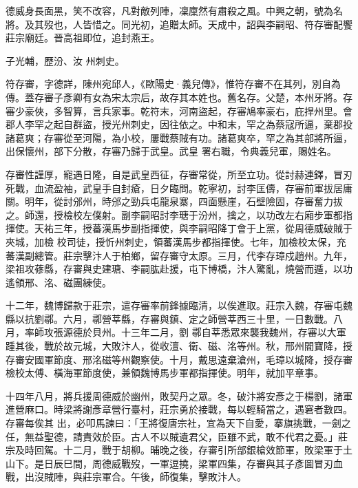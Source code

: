 \begin{pinyinscope}
 德威身長面黑，笑不改容，凡對敵列陣，凜廩然有肅殺之風。中興之朝，號為名將。及其歿也，人皆惜之。同光初，追贈太師。天成中，詔與李嗣昭、符存審配饗莊宗廟廷。晉高祖即位，追封燕王。



 子光輔，歷汾、汝
 州刺史。



 符存審，字德詳，陳州宛邱人，《歐陽史·義兒傳》，惟符存審不在其列，別自為傳。蓋存審子彥卿有女為宋太宗后，故存其本姓也。舊名存。父楚，本州牙將。存審少豪俠，多智算，言兵家事。乾符末，河南盜起，存審鳩率豪右，庇捍州里。會郡人李罕之起自群盜，授光州刺史，因往依之。中和末，罕之為蔡寇所逼，棄郡投諸葛爽；存審從至河陽，為小校，屢戰蔡賊有功。諸葛爽卒，罕之為其部將所逼，出保懷州，部下分散，存審乃歸于武皇。武皇
 署右職，令典義兒軍，賜姓名。



 存審性謹厚，寵遇日隆，自是武皇西征，存審常從，所至立功。從討赫連鐸，冒刃死戰，血流盈袖，武皇手自封瘡，日夕臨問。乾寧初，討李匡儔，存審前軍拔居庸關。明年，從討邠州，時邠之勁兵屯龍泉寨，四面懸崖，石壁險固，存審奮力拔之。師還，授檢校左僕射。副李嗣昭討李瑭于汾州，擒之，以功改左右廂步軍都指揮使。天祐三年，授蕃漢馬步副指揮使，與李嗣昭降丁會于上黨，從周德威破賊于夾城，加檢
 校司徒，授忻州刺史，領蕃漢馬步都指揮使。七年，加檢校太保，充蕃漢副總管。莊宗擊汴人于柏鄉，留存審守太原。三月，代李存璋戍趙州。九年，梁祖攻蓚縣，存審與史建瑭、李嗣肱赴援，屯下博橋，汴人驚亂，燒營而遁，以功遙領邢、洺、磁團練使。



 十二年，魏博歸款于莊宗，遣存審率前鋒據臨清，以俟進取。莊宗入魏，存審屯魏縣以抗劉鄩。六月，鄩營莘縣，存審與鎮、定之師營莘西三十里，一日數戰。八月，率師攻張源德於貝州。十三年二月，劉
 鄩自莘悉眾來襲我魏州，存審以大軍踵其後，戰於故元城，大敗汴人，從收澶、衛、磁、洺等州。秋，邢州閻寶降，授存審安國軍節度、邢洺磁等州觀察使。十月，戴思遠棄滄州，毛璋以城降，授存審檢校太傅、橫海軍節度使，兼領魏博馬步軍都指揮使。明年，就加平章事。



 十四年八月，將兵援周德威於幽州，敗契丹之眾。冬，破汴將安彥之于楊劉，諸軍進營麻口。時梁將謝彥章營行臺村，莊宗勇於接戰，每以輕騎當之，遇窘者數四。存審每俟其
 出，必叩馬諫曰：「王將復唐宗社，宜為天下自愛，搴旗挑戰，一劍之任，無益聖德，請責效於臣。古人不以賊遺君父，臣雖不武，敢不代君之憂。」莊宗及時回駕。十二月，戰于胡柳。晡晚之後，存審引所部銀槍效節軍，敗梁軍于土山下。是日辰巳間，周德威戰歿，一軍逗撓，梁軍四集，存審與其子彥圖冒刃血戰，出沒賊陣，與莊宗軍合。午後，師復集，擊敗汴人。




\end{pinyinscope}
